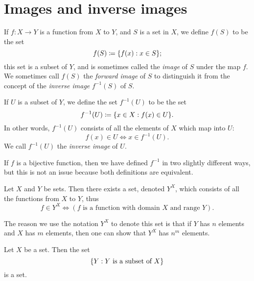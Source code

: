 \section{Images and inverse images}\label{sec:3.4}

\begin{defn}\label{3.4.1}
  If \(f : X \to Y\) is a function from \(X\) to \(Y\), and \(S\) is a set in \(X\), we define \(f(S)\) to be the set
  \[
    f(S) \coloneqq \set{f(x) : x \in S};
  \]
  this set is a subset of \(Y\), and is sometimes called the \emph{image} of \(S\) under the map \(f\).
  We sometimes call \(f(S)\) the \emph{forward image} of \(S\) to distinguish it from the concept of the \emph{inverse image} \(f^{-1}(S)\) of \(S\).
\end{defn}

\setcounter{thm}{3}
\begin{defn}\label{3.4.4}
  If \(U\) is a subset of \(Y\), we define the set \(f^{-1}(U)\) to be the set
  \[
    f^{-1}(U) \coloneqq \set{x \in X : f(x) \in U}.
  \]
  In other words, \(f^{-1}(U)\) consists of all the elements of \(X\) which map into \(U\):
  \[
    f(x) \in U \iff x \in f^{-1}(U).
  \]
  We call \(f^{-1}(U)\) the \emph{inverse image} of \(U\).
\end{defn}

\setcounter{thm}{6}
\begin{rmk}\label{3.4.6}
  If \(f\) is a bijective function, then we have defined \(f^{-1}\) in two slightly different ways, but this is not an issue because both definitions are equivalent.
\end{rmk}

\begin{ax}\label{3.10}
  Let \(X\) and \(Y\) be sets.
  Then there exists a set, denoted \(Y^X\), which consists of all the functions from \(X\) to \(Y\), thus
  \[
    f \in Y^X \iff (f \text{ is a function with domain } X \text{ and range } Y).
  \]
\end{ax}

\begin{note}
  The reason we use the notation \(Y^X\) to denote this set is that if \(Y\) has \(n\) elements and \(X\) has \(m\) elements, then one can show that \(Y^X\) has \(n^m\) elements.
\end{note}

\setcounter{thm}{8}
\begin{lem}\label{3.4.9}
  Let \(X\) be a set.
  Then the set
  \[
    \left\lbrace Y : Y \text{ is a subset of } X\right\rbrace
  \]
  is a set.
\end{lem}

